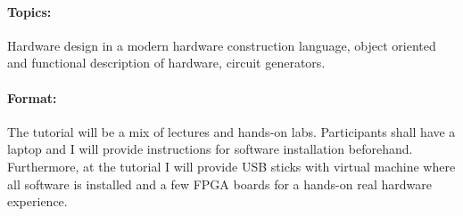 \documentclass{article}
\begin{document}
\paragraph{Topics:} Hardware design in a modern hardware construction language, object oriented and
functional description of hardware, circuit generators.

\paragraph{Format:}
The tutorial will be a mix of lectures and hands-on labs. Participants shall have a laptop and I will provide
instructions for software installation beforehand. Furthermore, at the tutorial I will provide USB sticks
with virtual machine where all software is installed and a few FPGA boards for a hands-on real
hardware experience.
\end{document}
